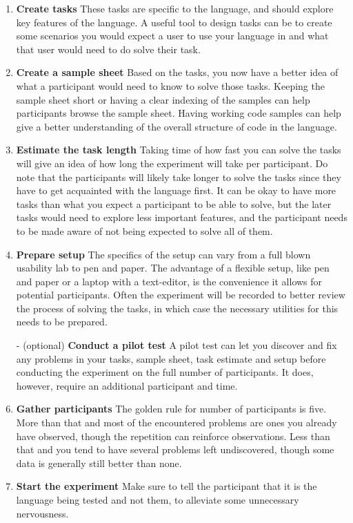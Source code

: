\documentclass[preprint,10pt]{sigplanconf}
\begin{document}
\begin{enumerate}
\item \textbf{Create tasks} These tasks are specific to the language, and should explore key features of the language. A useful tool to design tasks can be to create some scenarios you would expect a user to use your language in and what that user would need to do solve their task.
\item \textbf{Create a sample sheet} Based on the tasks, you now have a better idea of what a participant would need to know to solve those tasks. Keeping the sample sheet short or having a clear indexing of the samples can help participants browse the sample sheet. Having working code samples can help give a better understanding of the overall structure of code in the language.
\item \textbf{Estimate the task length} Taking time of how fast you can solve the tasks will give an idea of how long the experiment will take per participant. Do note that the participants will likely take longer to solve the tasks since they have to get acquainted with the language first. It can be okay to have more tasks than what you expect a participant to be able to solve, but the later tasks would need to explore less important features, and the participant needs to be made aware of not being expected to solve all of them.
\item \textbf{Prepare setup} The specifics of the setup can vary from a full blown usability lab to pen and paper. The advantage of a flexible setup, like pen and paper or a laptop with a text-editor, is the convenience it allows for potential participants. Often the experiment will be recorded to better review the process of solving the tasks, in which case the necessary utilities for this needs to be prepared.
\item[-] (optional) \textbf{Conduct a pilot test} A pilot test can let you discover and fix any problems in your tasks, sample sheet, task estimate and setup before conducting the experiment on the full number of participants. It does, however, require an additional participant and time.
\item \textbf{Gather participants} The golden rule for number of participants is five. More than that and most of the encountered problems are ones you already have observed, though the repetition can reinforce observations. Less than that and you tend to have several problems left undiscovered, though some data is generally still better than none.
\item \textbf{Start the experiment} Make sure to tell the participant that it is the language being tested and not them, to alleviate some unnecessary nervousness.

\end{enumerate}
\end{document}
